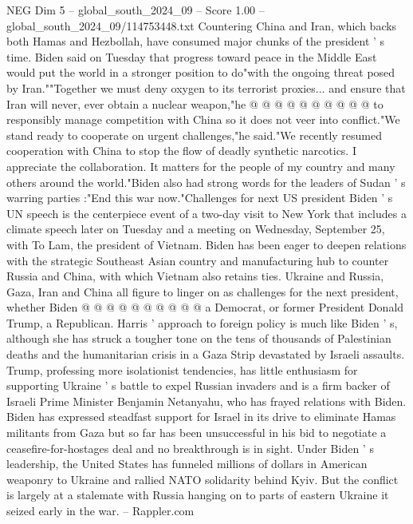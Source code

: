 \begin{textsample}{NEG Dim 5 – global\_south\_2024\_09 – Score 1.00 – global\_south\_2024\_09/114753448.txt}
Countering China and Iran, which backs both Hamas and Hezbollah, have consumed major chunks of the president ' s time.
Biden said on Tuesday that progress toward peace in the Middle East would put the world in a stronger position to do"with the ongoing threat posed by Iran.""Together we must deny oxygen to its terrorist proxies... and ensure that Iran will never, ever obtain a nuclear weapon,"he @ @ @ @ @ @ @ @ @ @ to responsibly manage competition with China so it does not veer into conflict."We stand ready to cooperate on urgent challenges,"he said."We recently resumed cooperation with China to stop the flow of deadly synthetic narcotics.
I appreciate the collaboration.
It matters for the people of my country and many others around the world."Biden also had strong words for the leaders of Sudan ' s warring parties :"End this war now."Challenges for next US president Biden ' s UN speech is the centerpiece event of a two-day visit to New York that includes a climate speech later on Tuesday and a meeting on Wednesday, September 25, with To Lam, the president of Vietnam.
Biden has been eager to deepen relations with the strategic Southeast Asian country and manufacturing hub to counter Russia and China, with which Vietnam also retains ties.
Ukraine and Russia, Gaza, Iran and China all figure to linger on as challenges for the next president, whether Biden @ @ @ @ @ @ @ @ @ @ a Democrat, or former President Donald Trump, a Republican.
Harris ' approach to foreign policy is much like Biden ' s, although she has struck a tougher tone on the tens of thousands of Palestinian deaths and the humanitarian crisis in a Gaza Strip devastated by Israeli assaults.
Trump, professing more isolationist tendencies, has little enthusiasm for supporting Ukraine ' s battle to expel Russian invaders and is a firm backer of Israeli Prime Minister Benjamin Netanyahu, who has frayed relations with Biden.
Biden has expressed steadfast support for Israel in its drive to eliminate Hamas militants from Gaza but so far has been unsuccessful in his bid to negotiate a ceasefire-for-hostages deal and no breakthrough is in sight.
Under Biden ' s leadership, the United States has funneled millions of dollars in American weaponry to Ukraine and rallied NATO solidarity behind Kyiv.
But the conflict is largely at a stalemate with Russia hanging on to parts of eastern Ukraine it seized early in the war. -- Rappler.com

\end{textsample}
